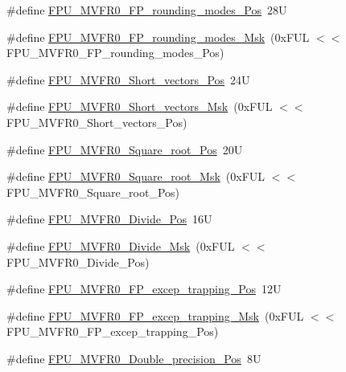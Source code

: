 \begin{DoxyCompactItemize}
\item 
\#define \mbox{\hyperlink{group___c_m_s_i_s___f_p_u_ga1ebcc9076f08013f0ea814540df03e82}{F\+P\+U\+\_\+\+M\+V\+F\+R0\+\_\+\+F\+P\+\_\+rounding\+\_\+modes\+\_\+\+Pos}}~28U
\item 
\#define \mbox{\hyperlink{group___c_m_s_i_s___f_p_u_gae6dc9339ac72227d5d54360bb9fbef1b}{F\+P\+U\+\_\+\+M\+V\+F\+R0\+\_\+\+F\+P\+\_\+rounding\+\_\+modes\+\_\+\+Msk}}~(0x\+F\+U\+L $<$$<$ F\+P\+U\+\_\+\+M\+V\+F\+R0\+\_\+\+F\+P\+\_\+rounding\+\_\+modes\+\_\+\+Pos)
\item 
\#define \mbox{\hyperlink{group___c_m_s_i_s___f_p_u_gabbf83a918536ebf10889cee71a0404c7}{F\+P\+U\+\_\+\+M\+V\+F\+R0\+\_\+\+Short\+\_\+vectors\+\_\+\+Pos}}~24U
\item 
\#define \mbox{\hyperlink{group___c_m_s_i_s___f_p_u_gabf261a72023fdfc64f32c6b21d55c5b9}{F\+P\+U\+\_\+\+M\+V\+F\+R0\+\_\+\+Short\+\_\+vectors\+\_\+\+Msk}}~(0x\+F\+U\+L $<$$<$ F\+P\+U\+\_\+\+M\+V\+F\+R0\+\_\+\+Short\+\_\+vectors\+\_\+\+Pos)
\item 
\#define \mbox{\hyperlink{group___c_m_s_i_s___f_p_u_ga176c85453ba03257bf263adec05f7344}{F\+P\+U\+\_\+\+M\+V\+F\+R0\+\_\+\+Square\+\_\+root\+\_\+\+Pos}}~20U
\item 
\#define \mbox{\hyperlink{group___c_m_s_i_s___f_p_u_ga3ec0bfec1640bdaf9dff027f275b446d}{F\+P\+U\+\_\+\+M\+V\+F\+R0\+\_\+\+Square\+\_\+root\+\_\+\+Msk}}~(0x\+F\+U\+L $<$$<$ F\+P\+U\+\_\+\+M\+V\+F\+R0\+\_\+\+Square\+\_\+root\+\_\+\+Pos)
\item 
\#define \mbox{\hyperlink{group___c_m_s_i_s___f_p_u_ga167be203091e6cc7d00ad40ca48c4396}{F\+P\+U\+\_\+\+M\+V\+F\+R0\+\_\+\+Divide\+\_\+\+Pos}}~16U
\item 
\#define \mbox{\hyperlink{group___c_m_s_i_s___f_p_u_gaeb7370768c6cdf06f8a15c86c6102ed2}{F\+P\+U\+\_\+\+M\+V\+F\+R0\+\_\+\+Divide\+\_\+\+Msk}}~(0x\+F\+U\+L $<$$<$ F\+P\+U\+\_\+\+M\+V\+F\+R0\+\_\+\+Divide\+\_\+\+Pos)
\item 
\#define \mbox{\hyperlink{group___c_m_s_i_s___f_p_u_ga5c0715c41c4470f8bb0b6dcd34707f1c}{F\+P\+U\+\_\+\+M\+V\+F\+R0\+\_\+\+F\+P\+\_\+excep\+\_\+trapping\+\_\+\+Pos}}~12U
\item 
\#define \mbox{\hyperlink{group___c_m_s_i_s___f_p_u_ga29bbddd679e821e050699fda23e6c85e}{F\+P\+U\+\_\+\+M\+V\+F\+R0\+\_\+\+F\+P\+\_\+excep\+\_\+trapping\+\_\+\+Msk}}~(0x\+F\+U\+L $<$$<$ F\+P\+U\+\_\+\+M\+V\+F\+R0\+\_\+\+F\+P\+\_\+excep\+\_\+trapping\+\_\+\+Pos)
\item 
\#define \mbox{\hyperlink{group___c_m_s_i_s___f_p_u_ga461e26147be0c39402a78cb6249e8f84}{F\+P\+U\+\_\+\+M\+V\+F\+R0\+\_\+\+Double\+\_\+precision\+\_\+\+Pos}}~8U
$$
\end{DoxyCompactItemize}
